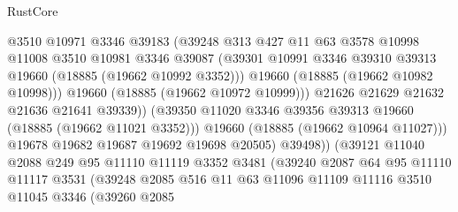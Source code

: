 \begin{lexlean}{RustCore}
\begin{coremodule}
                                @3510
                                @10971
                                @3346
                                @39183
                                (@39248
                                  @313
                                  @427
                                  @11
                                  @63
                                  @3578
                                  @10998
                                  @11008
                                  @3510
                                  @10981
                                  @3346
                                  @39087
                                  (@39301
                                    @10991
                                    @3346
                                    @39310
                                    @39313
                                    @19660
                                    (@18885 (@19662 @10992 @3352)))
                                  @19660
                                  (@18885 (@19662 @10982 @10998)))
                                @19660
                                (@18885 (@19662 @10972 @10999)))
                              @21626
                              @21629
                              @21632
                              @21636
                              @21641
                              @39339))
                          (@39350 @11020 @3346 @39356 @39313 @19660 (@18885 (@19662 @11021 @3352)))
                          @19660
                          (@18885 (@19662 @10964 @11027)))
                        @19678
                        @19682
                        @19687
                        @19692
                        @19698
                        @20505)
                      @39498))
                  (@39121
                    @11040
                    @2088
                    @249
                    @95
                    @11110
                    @11119
                    @3352
                    @3481
                    (@39240
                      @2087
                      @64
                      @95
                      @11110
                      @11117
                      @3531
                      (@39248
                        @2085
                        @516
                        @11
                        @63
                        @11096
                        @11109
                        @11116
                        @3510
                        @11045
                        @3346
                        (@39260
                          @2085

\end{coremodule}
\end{lexlean}

